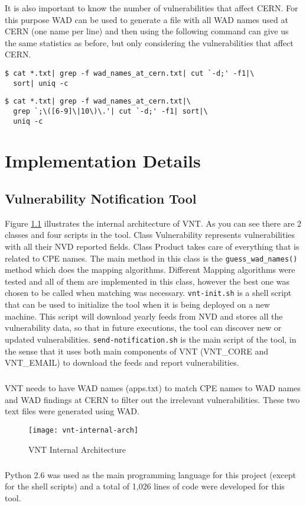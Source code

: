 It is also important to know the number of vulnerabilities that affect CERN. For this purpose WAD can be used to generate a file with all WAD names used at CERN (one name per line) and then using the following command can give us the same statistics as before, but only considering the vulnerabilities that affect CERN.
\begin{framed}
\begin{verbatim}
$ cat *.txt| grep -f wad_names_at_cern.txt| cut `-d;' -f1|\
  sort| uniq -c
\end{verbatim}
\end{framed}
\begin{framed}
\begin{verbatim}
$ cat *.txt| grep -f wad_names_at_cern.txt|\
  grep `;\([6-9]\|10\)\.'| cut `-d;' -f1| sort|\
  uniq -c
\end{verbatim}
\end{framed}
%
%
\chapter{Implementation Details}
\label{implementation-details}
\section{Vulnerability Notification Tool}

Figure \ref{figure:vnt-internal-arch} illustrates the internal architecture of VNT. As you can see there are 2 classes and four scripts in the tool. Class Vulnerability represents vulnerabilities with all their NVD reported fields. Class Product takes care of everything that is related to CPE names. The main method in this class is the \texttt{guess_wad_names()} method which does the mapping algorithms. Different Mapping algorithms were tested and all of them are implemented in this class, however the best one was chosen to be called when matching was necessary. \texttt{vnt-init.sh} is a shell script that can be used to initialize the tool when it is being deployed on a new machine. This script will download yearly feeds from NVD and stores all the vulnerability data, so that in future executions, the tool can discover new or updated vulnerabilities. \texttt{send-notification.sh} is the main script of the tool, in the sense that it uses both main components of VNT (VNT_CORE and VNT_EMAIL) to download the feeds and report vulnerabilities.
\paragraph{}
VNT needs to have WAD names (apps.txt) to match CPE names to WAD names and WAD findings at CERN to filter out the irrelevant vulnerabilities. These two text files were generated using WAD. 
\begin{figure}[h!]
  \centering
    \texttt{[image: vnt-internal-arch]}
  \caption{VNT Internal Architecture}
   \label{figure:vnt-internal-arch}
\end{figure}

\paragraph{}
Python 2.6 was used as the main programming language for this project (except for the shell scripts) and a total of 1,026 lines of code were developed for this tool. 
